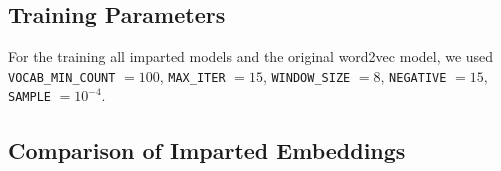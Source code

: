 \documentclass[11pt,a4paper]{article}
\begin{document}








\subsection{Training Parameters}
\label{app:training_parameters}

 For the training all imparted models and the original word2vec model, we used \verb|VOCAB_MIN_COUNT| $=100$, \verb|MAX_ITER| $=15$, \verb|WINDOW_SIZE| $=8$, \verb|NEGATIVE| $=15$, \verb|SAMPLE| $=10^{-4}$.
 
 
 
 
 
 
 
 \subsection{Comparison of Imparted Embeddings}
\label{app:impart_comparison}



\end{document}
